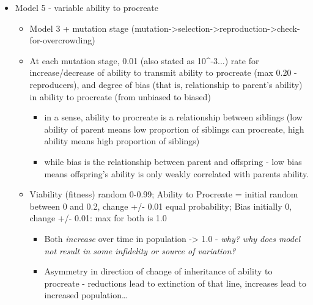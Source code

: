 \begin{itemize}
\begin{itemize}
	\end{itemize}
	\item
	
	Model 5 - variable ability to procreate
	
	
	\begin{itemize}
		\item
		
		Model 3 + mutation stage
		(mutation-\textgreater{}selection-\textgreater{}reproduction-\textgreater{}check-for-overcrowding)
		
		\item
		
		At each mutation stage, 0.01 (also stated as 10\^{}-3...) rate
		for increase/decrease of ability to transmit ability to
		procreate (max 0.20 - reproducers), and degree of bias (that is,
		relationship to parent's ability) in ability to procreate (from
		unbiased to biased)
		
		
		\begin{itemize}
			\item
			
			in a sense, ability to procreate is a relationship between
			siblings (low ability of parent means low proportion of
			siblings can procreate, high ability means high proportion of
			siblings)
			
			\item
			
			while bias is the relationship between parent and offspring -
			low bias means offspring's ability is only weakly correlated
			with parents ability.
			
		\end{itemize}
		\item
		
		Viability (fitness) random 0-0.99; Ability to Procreate =
		initial random between 0 and 0.2, change +/- 0.01 equal
		probability; Bias initially 0, change +/- 0.01: max for both is
		1.0
		
		
		\begin{itemize}
			\item
			
			Both \emph{increase} over time in population -\textgreater{}
			1.0 - \emph{why? why does model not result in some infidelity
				or source of variation? }
			
			\item
			
			Asymmetry in direction of change of inheritance of ability to
			procreate - reductions lead to extinction of that line,
			increases lead to increased population\ldots{}
			

\end{itemize}
\end{itemize}
\end{itemize}
